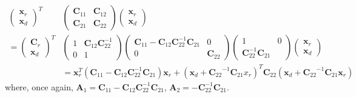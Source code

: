 \documentclass[micromachines,article,accept,pdftex,moreauthors]{Definitions/mdpi}
\begin{document}
\begin{align*}
{{\begin{pmatrix}\boldsymbol{x}_{r} \\ \boldsymbol{x}_{d}\end{pmatrix}}^T} & {\begin{pmatrix}\boldsymbol{C}_{11} & \boldsymbol{C}_{12} \\ \boldsymbol{C}_{21} & \boldsymbol{C}_{22} \end{pmatrix}} {\begin{pmatrix} \boldsymbol{x}_{r} \\ \boldsymbol{x}_{d} \end{pmatrix}} \\ 
= {\begin{pmatrix}\boldsymbol{C}_{r} \\ \boldsymbol{x}_{d}\end{pmatrix}}^T & \begin{pmatrix} 1 & \boldsymbol{C}_{12}\boldsymbol{C}_{22}^{-1} \\ 0 & 1 \end{pmatrix}{\begin{pmatrix} \boldsymbol{C}_{11} - \boldsymbol{C}_{12}\boldsymbol{C}_{22}^{-1}\boldsymbol{C}_{21} & 0 \\ 0 & \boldsymbol{C}_{22}\end{pmatrix}} %
{\begin{pmatrix} 1 & 0 \\ \boldsymbol{C}_{22}^{-1}\boldsymbol{C}_{21} & \end{pmatrix}}{\begin{pmatrix}\boldsymbol{x}_{r}\\\boldsymbol{x}_{d}\end{pmatrix}} \\ &
= \boldsymbol{x}_{r}^T \left({\boldsymbol{C}_{11}}-{\boldsymbol{C}_{12}}{\boldsymbol{C}_{22}^{-1}\boldsymbol{C}_{21}}\right)\boldsymbol{x}_{r} + %
\left(\boldsymbol{x}_{d} + {\boldsymbol{C}_{22}}^{-1}{\boldsymbol{C}_{21}}{x}_{r}\right)^{T} {\boldsymbol{C}_{22}}\left(\boldsymbol{x}_{d}+{\boldsymbol{C}_{22}}^{-1}{\boldsymbol{C}_{21}}\boldsymbol{x}_{r}\right)
\end{align*}
where, once again, $\boldsymbol{A}_{1} = \boldsymbol{C}_{11} - \boldsymbol{C}_{12}\boldsymbol{C}_{22}^{-1} \boldsymbol{C}_{21}$, $\boldsymbol{A}_{2} = -\boldsymbol{C}_{22}^{-1}\boldsymbol{C}_{21}$.
\end{document}
